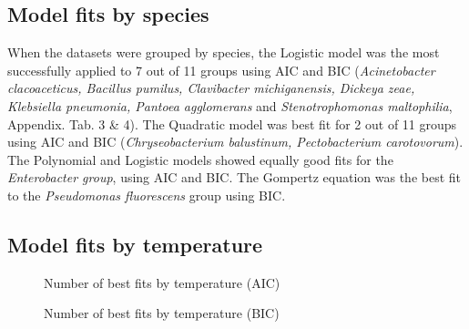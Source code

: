 \documentclass[titlepage]{article}
\begin{document}
\subsection{Model fits by species}

When the datasets were grouped by species, the Logistic model was the most successfully applied to 7 out of 11 groups using AIC and BIC (\textit{Acinetobacter clacoaceticus, Bacillus pumilus, Clavibacter michiganensis, Dickeya zeae, Klebsiella pneumonia, Pantoea agglomerans} and \textit{Stenotrophomonas maltophilia}, Appendix. Tab. 3 \& 4). The Quadratic model was best fit for 2 out of 11 groups using AIC and BIC (\textit{Chryseobacterium balustinum, Pectobacterium carotovorum}). The Polynomial and Logistic models showed equally good fits for the \textit{Enterobacter group}, using AIC and BIC. The Gompertz equation was the best fit to the \textit{Pseudomonas fluorescens} group using BIC.


\subsection{Model fits by temperature}
     


      \begin{figure}[!htb]
        \caption{\label{fig:my-label} Number of best fits by temperature (AIC)}
      \end{figure}
      
      \begin{figure}[!htb]
        \caption{\label{fig:my-label} Number of best fits by temperature (BIC)}
      \end{figure}
\end{document}
